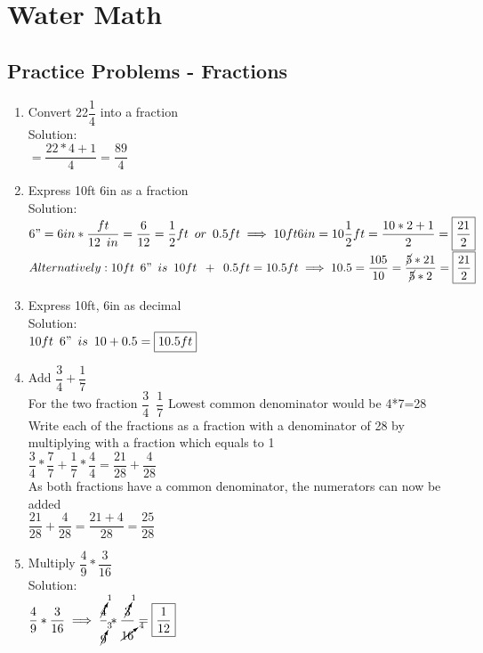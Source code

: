 \chapter{Water Math}

\section*{Practice Problems - Fractions}
\begin{enumerate}

\item Convert 22$\dfrac{1}{4}$ into a fraction\\
Solution:\\
$=\dfrac{22*4 + 1}{4}=\boxed{\dfrac{89}{4}}$

\item Express 10ft 6in as a fraction\\
Solution:\\
$6" = 6 in * \dfrac{ft}{12 \enspace in} = \dfrac{6}{12}=\dfrac{1}{2}ft \enspace or \enspace 0.5ft\implies 10ft 6in = 10\dfrac{1}{2}ft=\dfrac{10*2+1}{2}=\boxed{\dfrac{21}{2}}$\\
$Alternatively: 10 ft \enspace 6" \enspace is \enspace 10 ft \enspace + \enspace 0.5 ft= 10.5 ft \implies 10.5=\dfrac{105}{10} = \dfrac{\cancel{5}*21}{\cancel{5}*2}=\boxed{\dfrac{21}{2}}$
\item Express 10ft, 6in as decimal\\
Solution:\\
$10 ft \enspace 6" \enspace is \enspace 10 + 0.5 = \boxed{10.5 ft}$
\item Add $\dfrac{3}{4}+\dfrac{1}{7}$\\
For the two fraction $\dfrac{3}{4} \enspace \dfrac{1}{7} $
Lowest common denominator would be 4*7=28\\
\vspace{0.2cm}
Write each of the fractions as a fraction with a denominator of 28 by multiplying with a fraction which equals to 1\\
\vspace{0.2cm}
$\dfrac{3}{4}*\dfrac{7}{7}+\dfrac{1}{7}*\dfrac{4}{4}=\dfrac{21}{28}+\dfrac{4}{28}$\\
\vspace{0.2cm}
As both fractions have a common denominator, the numerators can now be added\\
\vspace{0.2cm}
$\dfrac{21}{28}+\dfrac{4}{28}=\dfrac{21+4}{28}=\boxed{\dfrac{25}{28}}$\\
\item Multiply $\dfrac{4}{9}*\dfrac{3}{16}$\\
Solution:\\
$\dfrac{4}{9}*\dfrac{3}{16} \implies \dfrac{\cancelto{1}{4}}{\cancelto{3}{9}}*\dfrac{\cancelto{1}{3}}{\cancelto{4}{16}}=\boxed{\dfrac{1}{12}}$\\
\end{enumerate}
